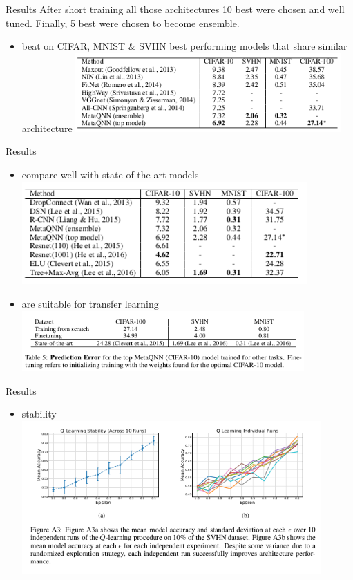 \documentclass[15pt]{beamer}
\begin{document}
\begin{frame}{Results}
After short training all those architectures 10 best were chosen and well tuned. Finally, 5 best were chosen to become ensemble.
\vskip0.1in
\begin{itemize}
  \item beat on CIFAR, MNIST \& SVHN best performing models that share similar architecture
  \includegraphics[width=0.8\textwidth]{best_on_similar.png}
  \end{itemize}
\end{frame}

\begin{frame}{Results}
  \begin{itemize}
  \item compare well with state-of-the-art models
  \includegraphics[width=0.86\textwidth]{state_art.png}
  \item are suitable for transfer learning
  \includegraphics[width=0.85\textwidth]{transfer.png}
  \end{itemize}
\end{frame}

\begin{frame}{Results}
  \begin{itemize}
  \item stability
  \includegraphics[width=0.9\textwidth]{stability.png}
  \end{itemize}
\end{frame}
\end{document}
